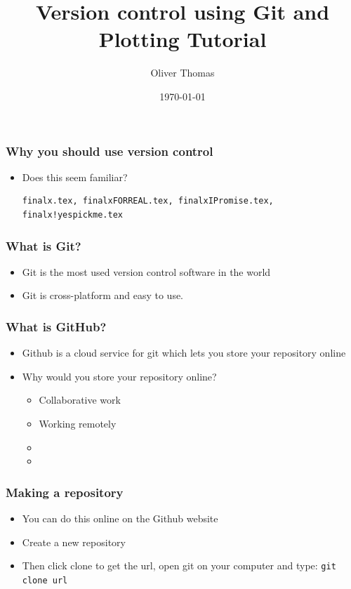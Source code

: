 \documentclass{beamer}
\title{Version control using Git and Plotting Tutorial}
\author{Oliver Thomas}
\institute{Quantum Engineering CDT \\ University of Bristol}
\date{\today}
\begin{document}
\frame{\titlepage}

\begin{frame}
\frametitle{Why you should use version control}
\begin{itemize}
	\item Does this seem familiar? 
\begin{verbatim}
finalx.tex, finalxFORREAL.tex, finalxIPromise.tex, finalx!yespickme.tex 
\end{verbatim}
\end{itemize}
\end{frame}

\begin{frame}
\frametitle{What is Git?}
\begin{itemize}
\item Git is the most used version control software in the world \footnotemark\ 
\item Git is cross-platform and easy to use.
\end{itemize}
\end{frame}

\begin{frame}
\frametitle{What is GitHub?}
\begin{itemize} 
\item Github is a cloud service for git which lets you store your repository online
\item Why would you store your repository online?
\begin{itemize}
\item Collaborative work  
\item Working remotely
\item  
\item
\end{itemize}
\end{itemize}
\end{frame}


\begin{frame}
\frametitle{Making a repository}
\begin{itemize}
\item You can do this online on the Github website   
\item Create a new repository
\item Then click clone to get the url, open git on your computer and type: 
	\texttt{git clone url}
\end{itemize}
\end{frame}
\end{document}

